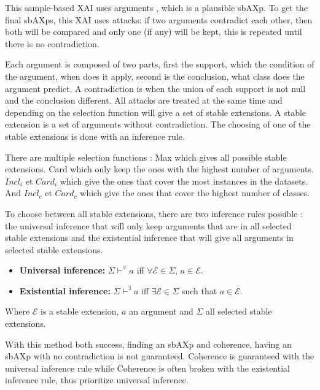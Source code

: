 This sample-based XAI uses arguments \cite{amgoud_leveraging_2023}, which is a plausible sbAXp. 
To get the final sbAXps, this XAI uses attacks: if two arguments contradict each other, then both 
will be compared and only one (if any) will be kept, this is repeated until there is no contradiction.

Each argument is composed of two parts, first the support, which the condition of the argument, 
when does it apply, second is the conclusion, what class does the argument predict.
A contradiction is when the union of each support is not null and the conclusion different. 
All attacks are treated at the same time and depending on the selection function will give a 
set of stable extensions. A stable extension is a set of arguments without contradiction. The 
choosing of one of the stable extensions is done with an inference rule.

There are multiple selection functions : Max which gives all possible stable extensions. Card which 
only keep the ones with the highest number of arguments. $Incl_i$ et $ Card_i$ which give the ones 
that cover the most instances in the datasets. And $Incl_c$ et $Card_c$ which give the ones that 
cover the highest number of classes. 

To choose between all stable extensions, there are two inference rules possible : the universal inference 
that will only keep arguments that are in all selected stable extensions and the existential inference that 
will give all arguments in selected stable extensions.
\begin{itemize}
    \item \textbf{Universal inference:} $\Sigma \vdash^{\forall} a$ iff $\forall \mathcal{E} \in \Sigma$, $a \in \mathcal{E}$.
    \item \textbf{Existential inference:} $\Sigma \vdash^{\exists} a$ iff $\exists \mathcal{E} \in \Sigma$ such that $a \in \mathcal{E}$.
\end{itemize}
Where $\mathcal{E} $ is a stable extension, $a$ an argument and $\Sigma$ all selected stable extensions. 

With this method both success, finding an sbAXp and coherence, having an sbAXp with no contradiction is not guaranteed. Coherence is guaranteed with the universal inference rule while Coherence is often broken with the existential inference rule, thus prioritize universal inference. \\